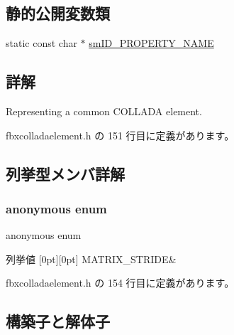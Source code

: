 \subsection*{静的公開変数類}
\begin{DoxyCompactItemize}
\item 
static const char $\ast$ \hyperlink{class_element_base_a9f75c1fda20fcc3c553e18c36be8221b}{sm\+I\+D\+\_\+\+P\+R\+O\+P\+E\+R\+T\+Y\+\_\+\+N\+A\+ME}
\end{DoxyCompactItemize}


\subsection{詳解}
Representing a common C\+O\+L\+L\+A\+DA element. 

 fbxcolladaelement.\+h の 151 行目に定義があります。



\subsection{列挙型メンバ詳解}
\mbox{\label{class_element_base_a67c3058543230affdf2d6ebb71a2acc5}} 
\subsubsection{\texorpdfstring{anonymous enum}{anonymous enum}}
{\footnotesize\ttfamily anonymous enum}

\begin{DoxyEnumFields}{列挙値}
[0pt][0pt]{}\mbox{\label{class_element_base_a67c3058543230affdf2d6ebb71a2acc5a858ba1419e1ab2616ccb5fbd91557074}} 
M\+A\+T\+R\+I\+X\+\_\+\+S\+T\+R\+I\+DE&\\
\hline

\end{DoxyEnumFields}


 fbxcolladaelement.\+h の 154 行目に定義があります。



\subsection{構築子と解体子}
\mbox{\label{class_element_base_a4c7415e032db4a4d1890edd5fed2eb01}} 
